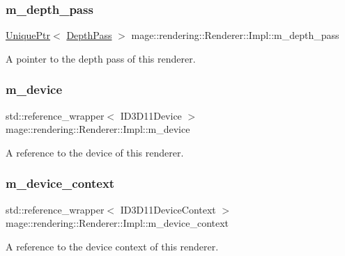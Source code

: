 \subsubsection{\texorpdfstring{m\+\_\+depth\+\_\+pass}{m\_depth\_pass}}
{\footnotesize\ttfamily \hyperlink{namespacemage_a3316d7143a973e37adf1110f2e80ca31}{Unique\+Ptr}$<$ \hyperlink{classmage_1_1rendering_1_1_depth_pass}{Depth\+Pass} $>$ mage\+::rendering\+::\+Renderer\+::\+Impl\+::m\+\_\+depth\+\_\+pass\hspace{0.3cm}{\ttfamily [private]}}

A pointer to the depth pass of this renderer. \hypertarget{classmage_1_1rendering_1_1_renderer_1_1_impl_acbd7937a78edf6a8c3f24fc0a300216b}{}\label{classmage_1_1rendering_1_1_renderer_1_1_impl_acbd7937a78edf6a8c3f24fc0a300216b} 
\subsubsection{\texorpdfstring{m\+\_\+device}{m\_device}}
{\footnotesize\ttfamily std\+::reference\+\_\+wrapper$<$ I\+D3\+D11\+Device $>$ mage\+::rendering\+::\+Renderer\+::\+Impl\+::m\+\_\+device\hspace{0.3cm}{\ttfamily [private]}}

A reference to the device of this renderer. \hypertarget{classmage_1_1rendering_1_1_renderer_1_1_impl_a4ab027121f4d0fd9ab8f35f5d2fcfca6}{}\label{classmage_1_1rendering_1_1_renderer_1_1_impl_a4ab027121f4d0fd9ab8f35f5d2fcfca6} 
\subsubsection{\texorpdfstring{m\+\_\+device\+\_\+context}{m\_device\_context}}
{\footnotesize\ttfamily std\+::reference\+\_\+wrapper$<$ I\+D3\+D11\+Device\+Context $>$ mage\+::rendering\+::\+Renderer\+::\+Impl\+::m\+\_\+device\+\_\+context\hspace{0.3cm}{\ttfamily [private]}}

A reference to the device context of this renderer. \hypertarget{classmage_1_1rendering_1_1_renderer_1_1_impl_a10cf7a42791591339e7abae67e1a0624}{}\label{classmage_1_1rendering_1_1_renderer_1_1_impl_a10cf7a42791591339e7abae67e1a0624} 
